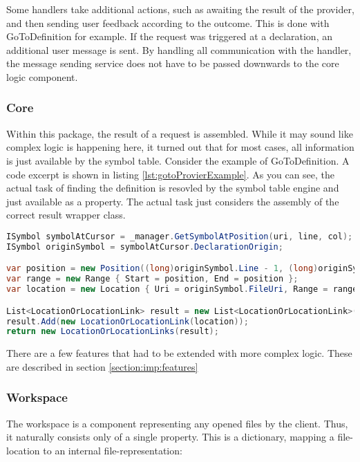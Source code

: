 Some handlers take additional actions, such as awaiting the result of the provider, and then sending user feedback according to the outcome.
This is done with GoToDefinition for example.
If the request was triggered at a declaration, an additional user message is sent.
By handling all communication with the handler, the message sending service does not have to be passed downwards to the core logic component.


\subsubsection{Core}
Within this package, the result of a request is assembled.
While it may sound like complex logic is happening here, it turned out that for most cases, all information is just available by the symbol table.
Consider the example of GoToDefinition.
A code excerpt is shown in listing \ref{lst:gotoProvierExample}.
As you can see, the actual task of finding the definition is resovled by the symbol table engine and just available as a property.
The actual task just considers the assembly of the correct result wrapper class.

\begin{lstlisting}[language=csharp, caption={GoToDefinition, Core Provider}, captionpos=b, label={lst:gotoProvierExample}]
ISymbol symbolAtCursor = _manager.GetSymbolAtPosition(uri, line, col);
ISymbol originSymbol = symbolAtCursor.DeclarationOrigin;

var position = new Position((long)originSymbol.Line - 1, (long)originSymbol.Column - 1);
var range = new Range { Start = position, End = position };
var location = new Location { Uri = originSymbol.FileUri, Range = range };

List<LocationOrLocationLink> result = new List<LocationOrLocationLink>();
result.Add(new LocationOrLocationLink(location));
return new LocationOrLocationLinks(result);
\end{lstlisting}

There are a few features that had to be extended with more complex logic.
These are described in section \ref{section:imp:features}

\subsubsection{Workspace}
The workspace is a component representing any opened files by the client.
Thus, it naturally consists only of a single property.
This is a dictionary, mapping a file-location to an internal file-representation:

